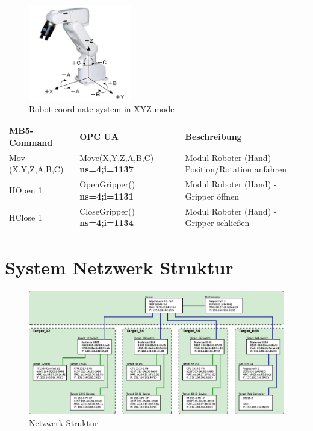 \documentclass[11pt,a4paper,ngerman]{article}
\begin{document}
\begin{figure}[htp]
	\centering
	\includegraphics[width=0.4\textwidth]{images/robot_axis.png}
	\caption{Robot coordinate system in XYZ mode}
	\label{fig:robot_axis}
\end{figure}

\begin{center}
	\setlength\extrarowheight{4pt}
	\small
	
	\begin{tabularx}{\textwidth}{|p{3cm}|p{4cm}|X|}
		\hline
		\rowcolor{tublau}
		\multicolumn{3}{|c|}{\bf \color{white} \large Gripper}\\
		\hline\hline
		\rowcolor{gray!80}
		\bf MB5-Command & \bf OPC UA & \bf Beschreibung\\
		\hline\hline
		Mov (X,Y,Z,A,B,C) & Move(X,Y,Z,A,B,C) \textbf{ns=4;i=1137} & Modul Roboter (Hand) - Position/Rotation anfahren\\
		HOpen 1 & OpenGripper() \textbf{ns=4;i=1131} & Modul Roboter (Hand) - Gripper öffnen\\
		HClose 1 & CloseGripper() \textbf{ns=4;i=1134} & Modul Roboter (Hand) - Gripper schließen\\
		\hline
	\end{tabularx}
\end{center}

\clearpage

\section{System Netzwerk Struktur}
\begin{figure}[!htb]
	\centering
	\includegraphics[width=.99\linewidth]{images/Network_Structure}
	\caption{Netzwerk Struktur}
	\label{fig_network_structure}
\end{figure}




\newpage
%
%

\makelast
\end{document}
